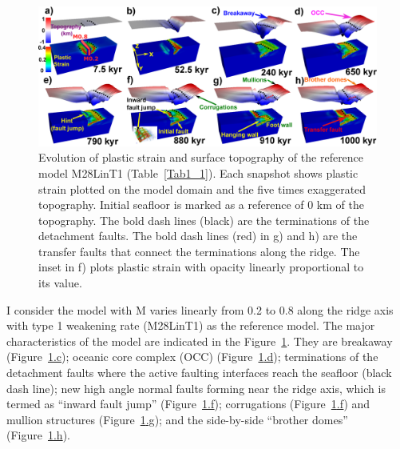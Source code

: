\begin{figure}[h]
  \centering
    \includegraphics[width=1.0\textwidth]{./Figures/fig_Results_1_reference_model.eps}
  \caption{Evolution of plastic strain and surface topography of the reference model M28LinT1 (Table~\hyperref[Tab1_1]{\ref{Tab1_1}}). Each snapshot shows plastic strain plotted on the model domain and the five times exaggerated topography. Initial seafloor is marked as a reference of 0 km of the topography. The bold dash lines (black) are the terminations of the detachment faults. The bold dash lines (red) in g) and h) are the transfer faults that connect the terminations along the ridge. The inset in f) plots plastic strain with opacity linearly proportional to its value.}%
 \label{fig_Results1_1}
\end{figure}   

I consider the model with M varies linearly from 0.2 to 0.8 along the ridge axis with type 1 weakening rate (M28LinT1) as the reference model. The major characteristics of the model are indicated in the Figure~\hyperref[fig_Results1_1]{\ref{fig_Results1_1}}. They are breakaway (Figure~\hyperref[fig_Results1_1]{\ref{fig_Results1_1}.c}); oceanic core complex (OCC) (Figure~\hyperref[fig_Results1_1]{\ref{fig_Results1_1}.d}); terminations of the detachment faults where the active faulting interfaces reach the seafloor (black dash line); new high angle normal faults forming near the ridge axis, which is termed as ``inward fault jump'' (Figure~\hyperref[fig_Results1_1]{\ref{fig_Results1_1}.f}); corrugations (Figure~\hyperref[fig_Results1_1]{\ref{fig_Results1_1}.f}) and mullion structures (Figure~\hyperref[fig_Results1_1]{\ref{fig_Results1_1}.g}); and the side-by-side ``brother domes'' (Figure~\hyperref[fig_Results1_1]{\ref{fig_Results1_1}.h}).    

